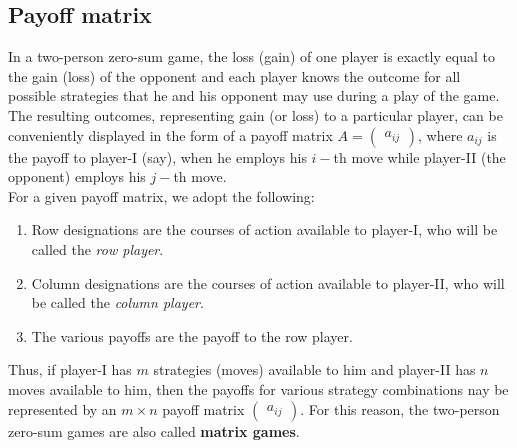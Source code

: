 \documentclass[../main-sheet.tex]{subfiles}
\begin{document}
\subsection{Payoff matrix}
In a two-person zero-sum game, the loss (gain) of one player is exactly equal to the gain (loss) of the opponent and each player knows the outcome for all possible strategies that he and his opponent may use during a play of the game. The resulting outcomes, representing gain (or loss) to a particular player, can be conveniently displayed in the form of a payoff matrix \(A=\begin{pmatrix}
    a_{ij}
\end{pmatrix}\), where \(a_{ij}\) is the payoff to player-I (say), when he employs his \(i-\)th move while player-II (the opponent) employs his \(j-\)th move.\\
For a given payoff matrix, we adopt the following:
\begin{enumerate}[label=(\roman*)]
    \item Row designations are the courses of action available to player-I, who will be called the \emph{row player}.
    \item Column designations are the courses of action available to player-II, who will be called the \emph{column player}.
    \item The various payoffs are the payoff to the row player.
\end{enumerate}
Thus, if player-I has \(m\) strategies (moves) available to him and player-II has \(n\) moves available to him, then the payoffs for various strategy combinations nay be represented by an \(m\times n\) payoff matrix \(\begin{pmatrix}
    a_{ij}
\end{pmatrix}\). For this reason, the two-person zero-sum games are also called \textbf{matrix games}.\\
\end{document}

